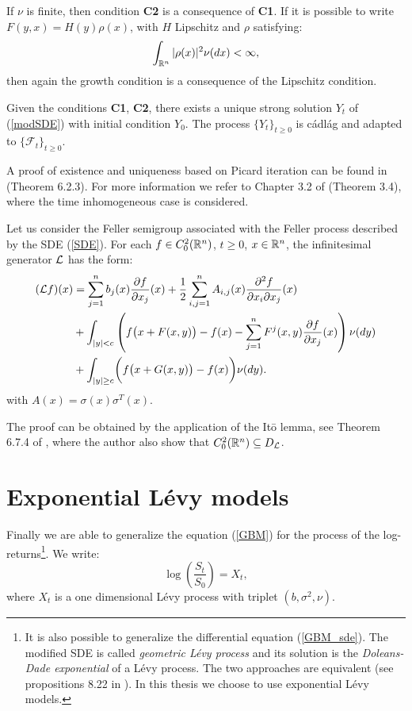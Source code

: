 If $\nu$ is finite, then condition \textbf{C2} is a consequence of \textbf{C1}. If it is possible to write $F(y,x) = H(y)\rho(x)$, with $H$ Lipschitz and 
$\rho$ satisfying:
\begin{equation}\label{rho}
 \int_{\mathbb{R}^n} |\rho(x)|^2 \nu(dx) < \infty,
\end{equation}
then again the growth condition is a consequence of the Lipschitz condition.
\begin{Theorem}
 Given the conditions \textbf{C1}, \textbf{C2}, there exists a unique strong solution $Y_t$ of (\ref{modSDE}) with initial condition $Y_{0}$.
 The process $\{Y_t\}_{t\geq 0}$ is cádlág and adapted to $\{\mathcal{F}_t\}_{t\geq 0}$.
\end{Theorem}
A proof of existence and uniqueness based on Picard iteration can be found in \cite{Applebaum} (Theorem 6.2.3). For more information we refer to Chapter 3.2 of
\cite{Skorohod} (Theorem 3.4), where the time inhomogeneous case is considered.


\begin{Theorem}
Let us consider the Feller semigroup associated with the Feller process described by the SDE (\ref{SDE}).
For each $f\in C_0^{2}(\mathbb{R}^n)$, $t\geq0$, $x\in \mathbb{R}^n$,
the infinitesimal generator $\mathcal{L}$ has the form:
\begin{align} \label{gen_jumpdiff}
  (\mathcal{L} f)(x) &=  \sum_{j=1}^n b_j(x) \frac{\partial f}{\partial x_j}(x) +
  \frac{1}{2} \sum_{i,j=1}^n A_{i,j}(x) \frac{\partial^2 f}{\partial x_i \partial x_j}(x)\\  \nonumber
           & + \int_{|y|<c} \left( f\bigl(x+F(x,y)\bigr) - f(x) - \sum_{j=1}^n F^j(x,y) \frac{\partial f}{\partial x_j}(x) \right) \nu(dy)  \\ \nonumber
           & + \int_{|y| \geq c} \biggl( f\bigl(x+G(x,y)\bigr) - f(x) \biggr) \nu(dy).   \nonumber
\end{align} 
with $A(x) = \sigma(x) \sigma^T(x)$.
\end{Theorem}
The proof can be obtained by the application of the It\={o} lemma, see Theorem 6.7.4 of \cite{Applebaum}, where the author also show that $C_0^{2}(\mathbb{R}^n) \subseteq D_{\mathcal{L}}$.   




\section{Exponential Lévy models}\label{Section_ELM}

Finally we are able to generalize the equation (\ref{GBM}) for the process of the log-returns\footnote{
It is also possible to generalize the differential equation (\ref{GBM_sde}). The modified SDE is called \emph{geometric Lévy process}
and its solution is the \emph{Doleans-Dade exponential} of a Lévy process. The two approaches are equivalent (see propositions 8.22 in \cite{Cont}).
In this thesis we choose to use exponential Lévy models.}.
We write:
\begin{equation}
 \log \left( \frac{S_t}{S_0} \right) = X_t ,
\end{equation}
where $X_t$ is a one dimensional Lévy process with triplet $(b,\sigma^2,\nu)$.


